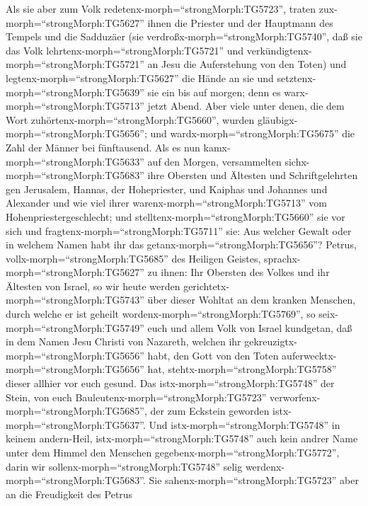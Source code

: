  Als sie aber zum Volk
redetenx-morph=``strongMorph:TG5723'', traten
zux-morph=``strongMorph:TG5627'' ihnen die Priester und der Hauptmann
des Tempels und die Sadduzäer  (sie
verdroßx-morph=``strongMorph:TG5740'', daß sie das Volk
lehrtenx-morph=``strongMorph:TG5721'' und
verkündigtenx-morph=``strongMorph:TG5721'' an Jesu die Auferstehung von
den Toten)  und legtenx-morph=``strongMorph:TG5627'' die
Hände an sie und setztenx-morph=``strongMorph:TG5639'' sie ein bis auf
morgen; denn es warx-morph=``strongMorph:TG5713'' jetzt Abend.
 Aber viele unter denen, die dem Wort
zuhörtenx-morph=``strongMorph:TG5660'', wurden
gläubigx-morph=``strongMorph:TG5656''; und
wardx-morph=``strongMorph:TG5675'' die Zahl der Männer bei fünftausend.
 Als es nun kamx-morph=``strongMorph:TG5633'' auf den
Morgen, versammelten sichx-morph=``strongMorph:TG5683'' ihre Obersten
und Ältesten und Schriftgelehrten gen Jerusalem,  Hannas,
der Hohepriester, und Kaiphas und Johannes und Alexander und wie viel
ihrer warenx-morph=``strongMorph:TG5713'' vom Hohenpriestergeschlecht;
 und stelltenx-morph=``strongMorph:TG5660'' sie vor sich und
fragtenx-morph=``strongMorph:TG5711'' sie: Aus welcher Gewalt oder in
welchem Namen habt ihr das getanx-morph=``strongMorph:TG5656''?
 Petrus, vollx-morph=``strongMorph:TG5685'' des Heiligen
Geistes, sprachx-morph=``strongMorph:TG5627'' zu ihnen: Ihr Obersten des
Volkes und ihr Ältesten von Israel,  so wir heute werden
gerichtetx-morph=``strongMorph:TG5743'' über dieser Wohltat an dem
kranken Menschen, durch welche er ist geheilt
wordenx-morph=``strongMorph:TG5769'',  so
seix-morph=``strongMorph:TG5749'' euch und allem Volk von Israel
kundgetan, daß in dem Namen Jesu Christi von Nazareth, welchen ihr
gekreuzigtx-morph=``strongMorph:TG5656'' habt, den Gott von den Toten
auferwecktx-morph=``strongMorph:TG5656'' hat,
stehtx-morph=``strongMorph:TG5758'' dieser allhier vor euch gesund.
 Das istx-morph=``strongMorph:TG5748'' der Stein, von euch
Bauleutenx-morph=``strongMorph:TG5723''
verworfenx-morph=``strongMorph:TG5685'', der zum Eckstein geworden
istx-morph=``strongMorph:TG5637''.  Und
istx-morph=``strongMorph:TG5748'' in keinem andern-Heil,
istx-morph=``strongMorph:TG5748'' auch kein andrer Name unter dem Himmel
den Menschen gegebenx-morph=``strongMorph:TG5772'', darin wir
sollenx-morph=``strongMorph:TG5748'' selig
werdenx-morph=``strongMorph:TG5683''.  Sie
sahenx-morph=``strongMorph:TG5723'' aber an die Freudigkeit des Petrus
